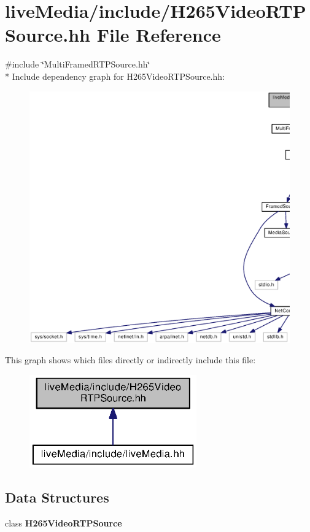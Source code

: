 \section{live\+Media/include/\+H265\+Video\+R\+T\+P\+Source.hh File Reference}
\label{H265VideoRTPSource_8hh}
{\ttfamily \#include \char`\"{}Multi\+Framed\+R\+T\+P\+Source.\+hh\char`\"{}}\\*
Include dependency graph for H265\+Video\+R\+T\+P\+Source.\+hh\+:
\nopagebreak
\begin{figure}[H]
\begin{center}
\leavevmode
\includegraphics[width=350pt]{H265VideoRTPSource_8hh__incl}
\end{center}
\end{figure}
This graph shows which files directly or indirectly include this file\+:
\nopagebreak
\begin{figure}[H]
\begin{center}
\leavevmode
\includegraphics[width=204pt]{H265VideoRTPSource_8hh__dep__incl}
\end{center}
\end{figure}
\subsection*{Data Structures}
\begin{DoxyCompactItemize}
\item 
class {\bf H265\+Video\+R\+T\+P\+Source}
\end{DoxyCompactItemize}
